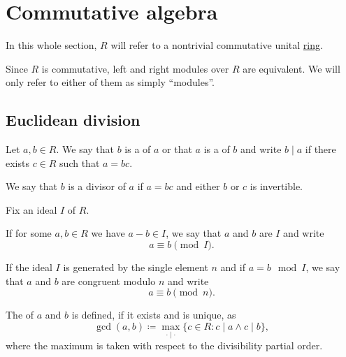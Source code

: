\section{Commutative algebra}\label{sec:commutative_algebra}

\begin{remark}\label{remark:polynomial_commutative_ring}
  In this whole section, \( R \) will refer to a nontrivial commutative unital \hyperref[def:semiring/commutative_unital_ring]{ring}.

  Since \( R \) is commutative, left and right modules over \( R \) are equivalent. We will only refer to either of them as simply \enquote{modules}.
\end{remark}

\subsection{Euclidean division}\label{subsec:euclidean_division}

\begin{definition}\label{def:commutative_ring_division}
  Let \( a, b \in R \). We say that \( b \) is a  of \( a \) or that \( a \) is a  of \( b \) and write \( b \mid a \) if there exists \( c \in R \) such that \( a = bc \).

  We say that \( b \) is a  divisor of \( a \) if \( a = bc \) and either \( b \) or \( c \) is invertible.
\end{definition}

\begin{definition}\label{def:modulo}
  Fix an ideal \( I \) of \( R \).

  If for some \( a, b \in R \) we have \( a - b \in I \), we say that \( a \) and \( b \) are  \( I \) and write
  \begin{equation*}
    a \equiv b \pmod I.
  \end{equation*}

  If the ideal \( I \) is generated by the single element \( n \) and if \( a = b \mod I \), we say that \( a \) and \( b \) are congruent modulo \( n \) and write
  \begin{equation*}
    a \equiv b \pmod n.
  \end{equation*}
\end{definition}

\begin{definition}\label{def:greatest_common_denominator}
  The   of \( a \) and \( b \) is defined, if it exists and is unique, as
  \begin{equation*}
    \gcd(a, b) \coloneqq \max_{\cdot \mid \cdot} \{ c \in R : c \mid a \land c \mid b \},
  \end{equation*}
  where the maximum is taken with respect to the divisibility partial order.
\end{definition}

